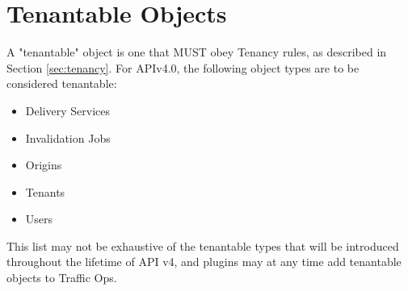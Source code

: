 %
%

\section{Tenantable Objects\label{sec:tenantable}}
A "tenantable" object is one that MUST obey Tenancy rules, as described in
Section \ref{sec:tenancy}. For APIv4.0, the following object types are to be considered tenantable:

\begin{itemize}
	\item Delivery Services
	\item Invalidation Jobs
	\item Origins
	\item Tenants
	\item Users
\end{itemize}

This list may not be exhaustive of the tenantable types that will be introduced
throughout the lifetime of API v4, and plugins may at any time add tenantable
objects to Traffic Ops.

